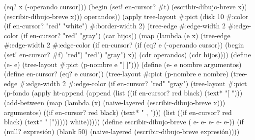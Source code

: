 \documentclass[letterpaper, twoside, openright, 11pt]{book}%
\begin{document}
{                                  (eq? x (-operando cursor)))
                             (begin
                               (set! en-cursor? #t)
                               (escribir-dibujo-breve x))
                             (escribir-dibujo-breve x)))
                       operandos))
    (apply tree-layout #:pict (disk 10
                                    #:color (if en-cursor? "red" "white")
                                    #:border-width 2)
           (tree-edge #:edge-width 2
                      #:edge-color (if en-cursor? "red" "gray")
                      (car hijos))
           (map (lambda (e x)
                  (tree-edge #:edge-width 2
                             #:edge-color
                             (if en-cursor?
                                 (if (eq? e (-operando cursor))
                                     (begin
                                       (set! en-cursor? #f)
                                       "red")
                                     "red")
                                 "gray")
                             x))
                (cdr operandos)
                (cdr hijos))))
  (define (e- e)
    (tree-layout #:pict (p-nombre e "[ ]")))
  (define (e- e nombre argumentos)
    (define en-cursor? (eq? e cursor))
    (tree-layout
     #:pict (p-nombre e nombre)
     (tree-edge #:edge-width 2
                #:edge-color (if en-cursor? "red" "gray")
                (tree-layout
                 #:pict
                 (p-fondo
                  (apply ht-append
                         (append (list ((if en-cursor? red black) (text* "[ ")))
                                 (add-between
                                  (map (lambda (x)
                                         (naive-layered (escribir-dibujo-breve x)))
                                       argumentos)
                                  ((if en-cursor? red black) (text* " , ")))
                                 (list ((if en-cursor? red black) (text* " ]")))))
                  white)))))
  (define escribir-dibujo-breve
    ( e- e- e-
                    e- e-))
  (if (null? expresión)
      (blank 50)
      (naive-layered (escribir-dibujo-breve expresión))))

}
\end{document}
